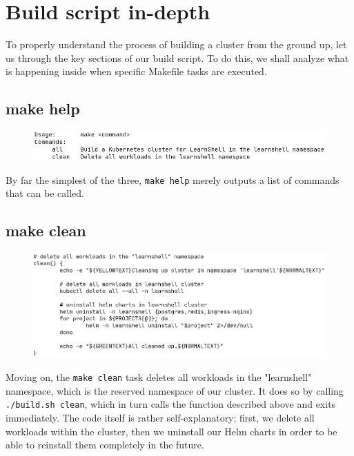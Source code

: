 \documentclass[thesis=B,english]{FITthesis}[2019/12/23]
\begin{document}
\section{Build script in-depth}

To properly understand the process of building a cluster from the ground up, let us through the key sections of our build script. To do this, we shall analyze what is happening inside when specific Makefile tasks are executed.

\subsection{make help}

\begin{figure}[H]
\centering
\hspace*{-0.5cm}
\includegraphics[scale=0.5]{build-help}
\end{figure}

By far the simplest of the three, \verb|make help| merely outputs a list of commands that can be called.

\subsection{make clean}

\begin{figure}[H]
\centering
\hspace*{-0.5cm}
\includegraphics[scale=0.5]{build-clean}
\end{figure}

Moving on, the \verb|make clean| task deletes all workloads in the "learnshell" namespace, which is the reserved namespace of our cluster. It does so by calling \verb|./build.sh clean|, which in turn calls the function described above and exits immediately. The code itself is rather self-explanatory; first, we delete all workloads within the cluster, then we uninstall our Helm charts in order to be able to reinstall them completely in the future.
\end{document}
